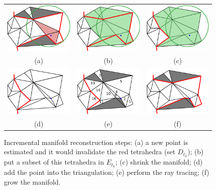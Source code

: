 \begin{figure}[tp]
\centering
 \begin{tabular}{ccc}
  \includegraphics[width=0.31\columnwidth]{./img/ch_soa/manifoldRec01}&
  \includegraphics[width=0.31\columnwidth]{./img/ch_soa/manifoldRec02}&
  \includegraphics[width=0.31\columnwidth]{./img/ch_soa/manifoldRec03}\\
  (a)&(b)&(c)\\
  \includegraphics[width=0.31\columnwidth]{./img/ch_soa/manifoldRec04}&
  \includegraphics[width=0.31\columnwidth]{./img/ch_soa/manifoldRec05}&
  \includegraphics[width=0.31\columnwidth]{./img/ch_soa/manifoldRec06}\\
  (d)&(e)&(f)\\
  
 \end{tabular}
 \caption{Incremental manifold reconstruction steps: (a) a new point is estimated and it would invalidate the red tetrahedra (set $D_{t_k}$); (b) put a subset of this tetrahedra in $E_{t_k}$; (c) shrink the manifold; (d) add the point into the triangulation; (e) perform the ray tracing; (f) grow the manifold.}
 \label{fig:manifoldreconstruction}
\end{figure}

